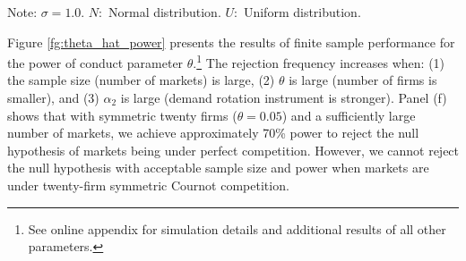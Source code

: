\documentclass[11pt, a4paper]{article}
\begin{document}
\begin{table}[!htbp]
    \caption{True parameters and distributions}
    \label{tb:parameter_setting}
    \begin{center}
    \end{center}
    \footnotesize
    Note: $\sigma=1.0$. $N:$ Normal distribution. $U:$ Uniform distribution.
\end{table}

Figure \ref{fg:theta_hat_power} presents the results of finite sample performance for the power of conduct parameter $\theta$.\footnote{See online appendix for simulation details and additional results of all other parameters.}
The rejection frequency increases when: (1) the sample size (number of markets) is large, (2) $\theta$ is large (number of firms is smaller), and (3) $\alpha_2$ is large (demand rotation instrument is stronger).
Panel (f) shows that with symmetric twenty firms ($\theta=0.05$) and a sufficiently large number of markets, we achieve approximately 70\% power to reject the null hypothesis of markets being under perfect competition.
However, we cannot reject the null hypothesis with acceptable sample size and power when markets are under twenty-firm symmetric Cournot competition.
\end{document}
